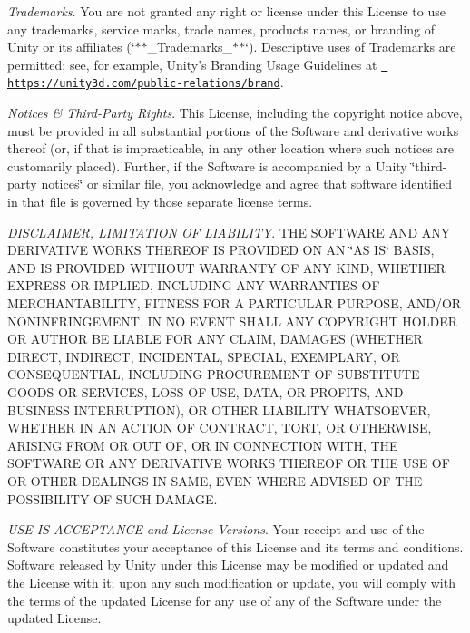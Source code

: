 \begin{DoxyEnumerate}
\item {\itshape Trademarks}. You are not granted any right or license under this License to use any trademarks, service marks, trade names, products names, or branding of Unity or its affiliates (\char`\"{}$\ast$$\ast$\+\_\+\+Trademarks\+\_\+$\ast$$\ast$\char`\"{}). Descriptive uses of Trademarks are permitted; see, for example, Unity’s Branding Usage Guidelines at \href{https://unity3d.com/public-relations/brand}{\texttt{ https\+://unity3d.\+com/public-\/relations/brand}}.
\end{DoxyEnumerate}
\begin{DoxyEnumerate}
\item {\itshape Notices \& Third-\/\+Party Rights}. This License, including the copyright notice above, must be provided in all substantial portions of the Software and derivative works thereof (or, if that is impracticable, in any other location where such notices are customarily placed). Further, if the Software is accompanied by a Unity \char`\"{}third-\/party notices\char`\"{} or similar file, you acknowledge and agree that software identified in that file is governed by those separate license terms.
\end{DoxyEnumerate}
\begin{DoxyEnumerate}
\item {\itshape DISCLAIMER, LIMITATION OF LIABILITY}. THE SOFTWARE AND ANY DERIVATIVE WORKS THEREOF IS PROVIDED ON AN \char`\"{}\+AS IS\char`\"{} BASIS, AND IS PROVIDED WITHOUT WARRANTY OF ANY KIND, WHETHER EXPRESS OR IMPLIED, INCLUDING ANY WARRANTIES OF MERCHANTABILITY, FITNESS FOR A PARTICULAR PURPOSE, AND/\+OR NONINFRINGEMENT. IN NO EVENT SHALL ANY COPYRIGHT HOLDER OR AUTHOR BE LIABLE FOR ANY CLAIM, DAMAGES (WHETHER DIRECT, INDIRECT, INCIDENTAL, SPECIAL, EXEMPLARY, OR CONSEQUENTIAL, INCLUDING PROCUREMENT OF SUBSTITUTE GOODS OR SERVICES, LOSS OF USE, DATA, OR PROFITS, AND BUSINESS INTERRUPTION), OR OTHER LIABILITY WHATSOEVER, WHETHER IN AN ACTION OF CONTRACT, TORT, OR OTHERWISE, ARISING FROM OR OUT OF, OR IN CONNECTION WITH, THE SOFTWARE OR ANY DERIVATIVE WORKS THEREOF OR THE USE OF OR OTHER DEALINGS IN SAME, EVEN WHERE ADVISED OF THE POSSIBILITY OF SUCH DAMAGE.
\end{DoxyEnumerate}
\begin{DoxyEnumerate}
\item {\itshape USE IS ACCEPTANCE and License Versions}. Your receipt and use of the Software constitutes your acceptance of this License and its terms and conditions. Software released by Unity under this License may be modified or updated and the License with it; upon any such modification or update, you will comply with the terms of the updated License for any use of any of the Software under the updated License.
\end{DoxyEnumerate}
